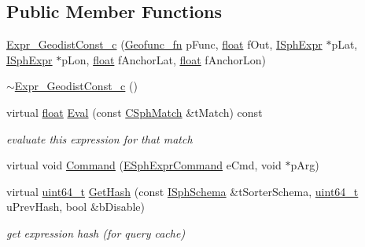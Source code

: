 \subsection*{Public Member Functions}
\begin{DoxyCompactItemize}
\item 
\hyperlink{classExpr__GeodistConst__c_a4a64b2f5de2ef8f5f0877f188957cce2}{Expr\-\_\-\-Geodist\-Const\-\_\-c} (\hyperlink{sphinxexpr_8cpp_a162dd05806302c01435e9c554f017be4}{Geofunc\-\_\-fn} p\-Func, \hyperlink{sphinxexpr_8cpp_a0e0d0739f7035f18f949c2db2c6759ec}{float} f\-Out, \hyperlink{structISphExpr}{I\-Sph\-Expr} $\ast$p\-Lat, \hyperlink{structISphExpr}{I\-Sph\-Expr} $\ast$p\-Lon, \hyperlink{sphinxexpr_8cpp_a0e0d0739f7035f18f949c2db2c6759ec}{float} f\-Anchor\-Lat, \hyperlink{sphinxexpr_8cpp_a0e0d0739f7035f18f949c2db2c6759ec}{float} f\-Anchor\-Lon)
\item 
\hyperlink{classExpr__GeodistConst__c_accac2eae601930db3b0c04c9a3a46f89}{$\sim$\-Expr\-\_\-\-Geodist\-Const\-\_\-c} ()
\item 
virtual \hyperlink{sphinxexpr_8cpp_a0e0d0739f7035f18f949c2db2c6759ec}{float} \hyperlink{classExpr__GeodistConst__c_a78b0f2088a776b188b5f8685825e61e7}{Eval} (const \hyperlink{classCSphMatch}{C\-Sph\-Match} \&t\-Match) const 
\begin{DoxyCompactList}\small\item\em evaluate this expression for that match \end{DoxyCompactList}\item 
virtual void \hyperlink{classExpr__GeodistConst__c_a28a91403536cae867a2e2a0141915620}{Command} (\hyperlink{sphinxexpr_8h_a30be184fb07bd80c271360fc6094c818}{E\-Sph\-Expr\-Command} e\-Cmd, void $\ast$p\-Arg)
\item 
virtual \hyperlink{sphinxstd_8h_aaa5d1cd013383c889537491c3cfd9aad}{uint64\-\_\-t} \hyperlink{classExpr__GeodistConst__c_a9e561980e2e8f456072915b72f89ad19}{Get\-Hash} (const \hyperlink{classISphSchema}{I\-Sph\-Schema} \&t\-Sorter\-Schema, \hyperlink{sphinxstd_8h_aaa5d1cd013383c889537491c3cfd9aad}{uint64\-\_\-t} u\-Prev\-Hash, bool \&b\-Disable)
\begin{DoxyCompactList}\small\item\em get expression hash (for query cache) \end{DoxyCompactList}\end{DoxyCompactItemize}
